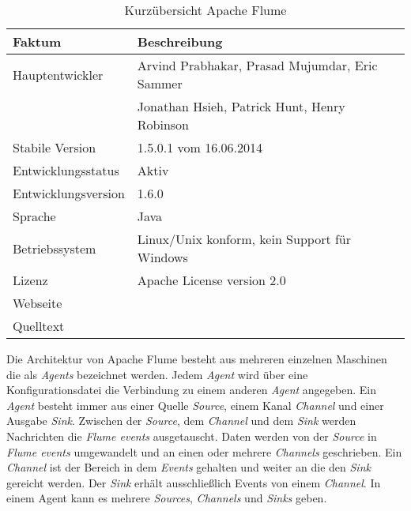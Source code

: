 \begin{table}[tbp]
	\centering
		\begin{tabular}{@{}ll@{}} \toprule
			\textbf{Faktum} & \textbf{Beschreibung} \\ \midrule
			Hauptentwickler & Arvind Prabhakar, Prasad Mujumdar, Eric Sammer \\
			& Jonathan Hsieh, Patrick Hunt, Henry Robinson \\
			Stabile Version & 1.5.0.1 vom 16.06.2014 \\ 
			Entwicklungsstatus &  Aktiv \\
			Entwicklungsversion & 1.6.0 \\
			Sprache & Java \\
			Betriebssystem & Linux/Unix konform, kein Support für Windows  \\
			Lizenz & Apache License version 2.0 \\
			Webseite & \citeint{flume:home} \\
			Quelltext & \citeint{flume:GitHubApacheMirror} \\			
			\bottomrule			
		\end{tabular}
	\caption{Kurzübersicht Apache Flume}
	\label{tab:vorflume}
\end{table}


Die Architektur von Apache Flume besteht aus mehreren einzelnen Maschinen die als \textit{Agents} bezeichnet werden. Jedem \textit{Agent} wird über eine Konfigurationsdatei die Verbindung zu einem anderen \textit{Agent} angegeben. Ein \textit{Agent} besteht immer aus einer Quelle \textit{Source}, einem Kanal \textit{Channel} und einer Ausgabe \textit{Sink}. Zwischen der \textit{Source}, dem \textit{Channel} und dem \textit{Sink} werden Nachrichten die \textit{Flume events} ausgetauscht. Daten werden von der \textit{Source} in \textit{Flume events} umgewandelt und an einen oder mehrere \textit{Channels} geschrieben. Ein \textit{Channel} ist der Bereich in dem \textit{Events} gehalten und weiter an die den \textit{Sink} gereicht werden. Der \textit{Sink} erhält ausschließlich Events von einem \textit{Channel}. In einem Agent kann es mehrere \textit{Sources}, \textit{Channels} und \textit{Sinks} geben.

